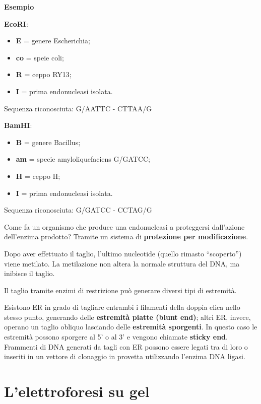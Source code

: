 \documentclass[11pt]{book}
\begin{document}
\textbf{Esempio}

\textbf{EcoRI}:

\begin{itemize}
\itemsep1pt\parskip0pt
\item
  \textbf{E} = genere Escherichia;
\item
  \textbf{co} = speie coli;
\item
  \textbf{R} = ceppo RY13;
\item
  \textbf{I} = prima endonucleasi isolata.
\end{itemize}

Sequenza riconosciuta: G/AATTC - CTTAA/G

\textbf{BamHI}:

\begin{itemize}
\itemsep1pt\parskip0pt
\item
  \textbf{B} = genere Bacillus;
\item
  \textbf{am} = specie amyloliquefaciens G/GATCC;
\item
  \textbf{H} = ceppo H;
\item
  \textbf{I} = prima endonucleasi isolata.
\end{itemize}

Sequenza riconosciuta: G/GATCC - CCTAG/G

Come fa un organismo che produce una endonucleasi a proteggersi
dall'azione dell'enzima prodotto? Tramite un sistema di
\textbf{protezione per modificazione}.

Dopo aver effettuato il taglio, l'ultimo nucleotide (quello rimasto
``scoperto'') viene metilato. La metilazione non altera la normale
struttura del DNA, ma inibisce il taglio.

Il taglio tramite enzimi di restrizione può generare diversi tipi di
estremità.

Esistono ER in grado di tagliare entrambi i filamenti della doppia elica
nello stesso punto, generando delle \textbf{estremità piatte (blunt
end)}; altri ER, invece, operano un taglio obliquo lasciando delle
\textbf{estremità sporgenti}. In questo caso le estremità possono
sporgere al 5' o al 3' e vengono chiamate \textbf{sticky end}. Frammenti
di DNA generati da tagli con ER possono essere legati tra di loro o
inseriti in un vettore di clonaggio in provetta utilizzando l'enzima DNA
ligasi.

\section{L'elettroforesi su gel}\label{lelettroforesi-su-gel}
\end{document}
